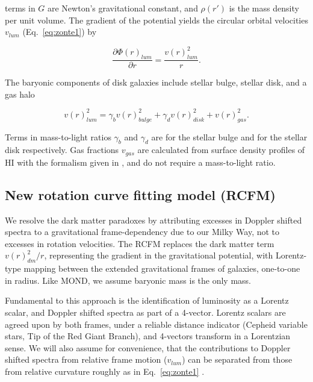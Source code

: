 \documentclass[reprint,%
 amsmath,amssymb,
 aps,
]{revtex4-1}
\begin{document}
   terms in  $G$   are  Newton's   gravitational constant, and 
$\rho(r')$ is the mass density per unit volume. 
The gradient of the potential    yields the circular orbital velocities $v_{lum}$ (Eq.~\ref{eq:zonte1}) by

\begin{equation}
 \frac{\partial \Phi(r)_{lum}}{\partial r}    =\frac{v(r)_{lum}^2}{r}.  
    \label{zoochance1}
\end{equation}

  

The baryonic components of disk   galaxies include stellar bulge, stellar disk, and a gas halo
  
   \begin{equation}
v(r)_{lum}^2 = \gamma_b v(r)_{bulge}^2 +  \gamma_d v(r)_{disk}^2 + v(r)_{gas}^2.  
\label{eq:zonte3}
\end{equation} 
  
Terms in mass-to-light ratios $\gamma_b$ and $\gamma_d$ are   for the stellar bulge and for the stellar disk      respectively. 
  Gas fractions $v_{gas}$ are calculated from surface density profiles of HI  with the formalism given in  \cite{1983MNRAS.203..735C}, and do not require  a mass-to-light ratio.  
  
 


\subsection{New rotation curve fitting model (RCFM)}

We resolve the dark matter    paradoxes    by  attributing excesses in Doppler shifted spectra to  a gravitational frame-dependency  due to our Milky Way, not to excesses in rotation velocities.  
The   RCFM  
replaces the dark matter term $v(r)^2_{dm}/r$,  representing the gradient in the gravitational potential,       with  Lorentz-type mapping between the extended gravitational frames of galaxies, one-to-one in radius.  Like MOND, we   assume baryonic mass is the only mass. 


Fundamental to this approach is the   identification of  luminosity   as a Lorentz scalar, and Doppler shifted spectra as part of a 4-vector. Lorentz scalars are agreed upon by both frames, under a reliable distance indicator  (Cepheid variable stars, Tip of the Red Giant Branch), and 4-vectors transform in a Lorentzian sense.  
We   will also assume for convenience,  that the contributions to  Doppler shifted spectra from  relative frame  motion ($v_{lum}$) can be  separated from those from relative curvature roughly as in Eq.~\ref{eq:zonte1} \cite{Jack,Cisn}.  
\end{document}
